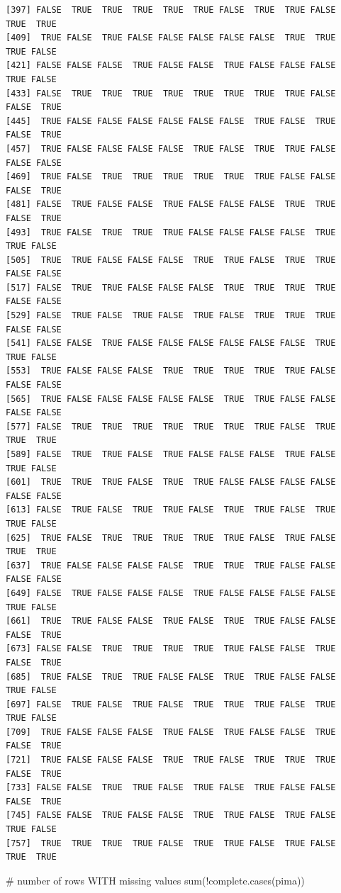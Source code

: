 \documentclass[
  letterpaper,
  DIV=11,
  numbers=noendperiod]{scrreprt}
\newenvironment{Shaded}{\begin{snugshade}}{\end{snugshade}}
\newcommand{\CommentTok}[1]{\textcolor[rgb]{0.37,0.37,0.37}{#1}}
\newcommand{\FunctionTok}[1]{\textcolor[rgb]{0.28,0.35,0.67}{#1}}
\newcommand{\NormalTok}[1]{\textcolor[rgb]{0.00,0.23,0.31}{#1}}
\newcommand{\SpecialCharTok}[1]{\textcolor[rgb]{0.37,0.37,0.37}{#1}}
\begin{document}
\begin{verbatim}
[397] FALSE  TRUE  TRUE  TRUE  TRUE  TRUE FALSE  TRUE  TRUE FALSE  TRUE  TRUE
[409]  TRUE FALSE  TRUE FALSE FALSE FALSE FALSE FALSE  TRUE  TRUE  TRUE FALSE
[421] FALSE FALSE FALSE  TRUE FALSE FALSE  TRUE FALSE FALSE FALSE  TRUE FALSE
[433] FALSE  TRUE  TRUE  TRUE  TRUE  TRUE  TRUE  TRUE  TRUE FALSE FALSE  TRUE
[445]  TRUE FALSE FALSE FALSE FALSE FALSE FALSE  TRUE FALSE  TRUE FALSE  TRUE
[457]  TRUE FALSE FALSE FALSE FALSE  TRUE FALSE  TRUE  TRUE FALSE FALSE FALSE
[469]  TRUE FALSE  TRUE  TRUE  TRUE  TRUE  TRUE  TRUE FALSE FALSE FALSE  TRUE
[481] FALSE  TRUE FALSE FALSE  TRUE FALSE FALSE FALSE  TRUE  TRUE FALSE  TRUE
[493]  TRUE FALSE  TRUE  TRUE  TRUE FALSE FALSE FALSE FALSE  TRUE  TRUE FALSE
[505]  TRUE  TRUE FALSE FALSE FALSE  TRUE  TRUE FALSE  TRUE  TRUE FALSE FALSE
[517] FALSE  TRUE  TRUE FALSE FALSE FALSE  TRUE  TRUE  TRUE  TRUE FALSE FALSE
[529] FALSE  TRUE FALSE  TRUE FALSE  TRUE FALSE  TRUE  TRUE  TRUE FALSE FALSE
[541] FALSE FALSE  TRUE FALSE FALSE FALSE FALSE FALSE FALSE  TRUE  TRUE FALSE
[553]  TRUE FALSE FALSE FALSE  TRUE  TRUE  TRUE  TRUE  TRUE FALSE FALSE FALSE
[565]  TRUE FALSE FALSE FALSE FALSE FALSE  TRUE  TRUE FALSE FALSE FALSE FALSE
[577] FALSE  TRUE  TRUE  TRUE  TRUE  TRUE  TRUE  TRUE FALSE  TRUE  TRUE  TRUE
[589] FALSE  TRUE  TRUE FALSE  TRUE FALSE FALSE FALSE  TRUE FALSE  TRUE FALSE
[601]  TRUE  TRUE  TRUE FALSE  TRUE  TRUE FALSE FALSE FALSE FALSE FALSE FALSE
[613] FALSE  TRUE FALSE  TRUE  TRUE FALSE  TRUE  TRUE FALSE  TRUE  TRUE FALSE
[625]  TRUE FALSE  TRUE  TRUE  TRUE  TRUE  TRUE FALSE  TRUE FALSE  TRUE  TRUE
[637]  TRUE FALSE FALSE FALSE FALSE  TRUE  TRUE  TRUE FALSE FALSE FALSE FALSE
[649] FALSE  TRUE FALSE FALSE FALSE  TRUE FALSE FALSE FALSE FALSE  TRUE FALSE
[661]  TRUE  TRUE FALSE FALSE  TRUE FALSE  TRUE  TRUE FALSE FALSE FALSE  TRUE
[673] FALSE FALSE  TRUE  TRUE  TRUE  TRUE  TRUE FALSE FALSE  TRUE FALSE  TRUE
[685]  TRUE FALSE  TRUE  TRUE FALSE FALSE  TRUE  TRUE FALSE FALSE  TRUE FALSE
[697] FALSE  TRUE FALSE  TRUE FALSE  TRUE  TRUE  TRUE FALSE  TRUE  TRUE FALSE
[709]  TRUE FALSE FALSE FALSE  TRUE FALSE  TRUE FALSE FALSE  TRUE FALSE  TRUE
[721]  TRUE FALSE FALSE FALSE  TRUE  TRUE FALSE  TRUE  TRUE  TRUE FALSE  TRUE
[733] FALSE FALSE  TRUE  TRUE FALSE  TRUE FALSE  TRUE FALSE FALSE FALSE  TRUE
[745] FALSE FALSE  TRUE FALSE FALSE  TRUE  TRUE FALSE  TRUE FALSE  TRUE FALSE
[757]  TRUE  TRUE  TRUE  TRUE FALSE  TRUE  TRUE FALSE  TRUE FALSE  TRUE  TRUE
\end{verbatim}

\begin{Shaded}
\begin{Highlighting}[]
\CommentTok{\# number of rows WITH missing values}
\FunctionTok{sum}\NormalTok{(}\SpecialCharTok{!}\FunctionTok{complete.cases}\NormalTok{(pima))}
\end{Highlighting}
\end{Shaded}
\end{document}

